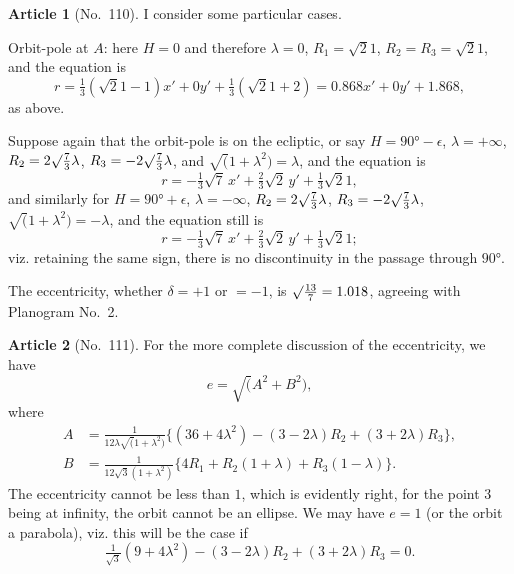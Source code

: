 \documentclass[11pt,a4paper]{article}
\theoremstyle{definition}
\newtheorem{art}{Article}
\begin{document}
\begin{art}[No.~110]
I consider some particular cases.

Orbit-pole at $A$: here $H = 0$ and therefore $\lambda = 0$, $R_1 = \surd 21$, $R_2 = R_3 = \surd 21$, and the equation is
\[
r = \tfrac{1}{3}(\surd 21 - 1)x' + 0y' + \tfrac{1}{3}(\surd 21 + 2) = 0.868x' + 0y' + 1.868,
\]
as above.

Suppose again that the orbit-pole is on the ecliptic, or say $H = 90° - \epsilon$, $\lambda = +\infty$, $R_2 = 2\surd\frac{7}{3}\lambda$, $R_3 = -2\surd\frac{7}{3}\lambda$, and $\surd(1 + \lambda^2) = \lambda$, and the equation is
\[
r = -\tfrac{1}{3}\surd 7\, x' + \tfrac{2}{3}\surd 2\, y' + \tfrac{1}{3}\surd 21,
\]
and similarly for $H = 90° + \epsilon$, $\lambda = -\infty$, $R_2 = 2\surd\frac{7}{3}\lambda$, $R_3 = -2\surd\frac{7}{3}\lambda$, $\surd(1 + \lambda^2) = -\lambda$, and the equation still is
\[
r = -\tfrac{1}{3}\surd 7\, x' + \tfrac{2}{3}\surd 2\, y' + \tfrac{1}{3}\surd 21;
\]
viz. retaining the same sign, there is no discontinuity in the passage through $90°$.

The eccentricity, whether $\delta = +1$ or $= -1$, is $\surd\frac{13}{7} = 1.018$, agreeing with Planogram No.~2.
\end{art}

\begin{art}[No.~111]
For the more complete discussion of the eccentricity, we have
\[
e = \surd(A^2 + B^2),
\]
where
\begin{align*}
A &= \frac{1}{12\lambda\surd(1 + \lambda^2)}\{(36 + 4\lambda^2) - (3 - 2\lambda)R_2 + (3 + 2\lambda)R_3\},\\
B &= \frac{1}{12\surd 3(1 + \lambda^2)}\{4R_1 + R_2(1 + \lambda) + R_3(1 - \lambda)\}.
\end{align*}
The eccentricity cannot be less than $1$, which is evidently right, for the point $3$ being at infinity, the orbit cannot be an ellipse. We may have $e = 1$ (or the orbit a parabola), viz. this will be the case if
\[
\tfrac{1}{\surd 3}(9 + 4\lambda^2) - (3 - 2\lambda)R_2 + (3 + 2\lambda)R_3 = 0.
\]
\end{art}
\end{document}
